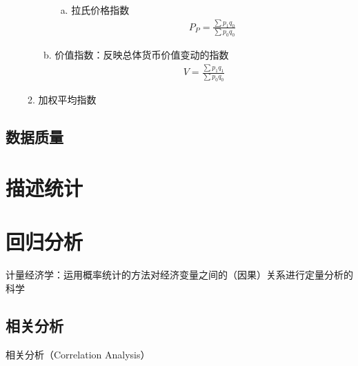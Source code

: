 \documentclass[12pt]{book}
\begin{document}
\begin{enumerate}[1.]
\begin{enumerate}[(1)]
\begin{enumerate}[a.]
\begin{enumerate}[(a)]
                                  \item 拉氏价格指数
                                        \begin{gather*}
                                            P_{P} = \frac{\sum{p_{1}q_{0}}}{\sum{p_{0}q_{0}}}
                                        \end{gather*}
                              \end{enumerate}
                        \item 价值指数：反映总体货币价值变动的指数
                              \begin{gather*}
                                  V = \frac{\sum{p_{1}q_{1}}}{\sum{p_{0}q_{0}}}
                              \end{gather*}
                    \end{enumerate}
              \item 加权平均指数
          \end{enumerate}
\end{enumerate}
















\section{数据质量}




\chapter{描述统计}





\chapter{回归分析}

计量经济学：运用概率统计的方法对经济变量之间的（因果）关系进行定量分析的科学

\section{相关分析}



相关分析（Correlation Analysis）
\end{document}
